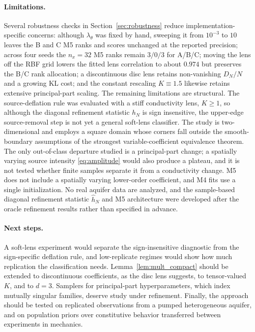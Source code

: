\documentclass[11pt]{article}
\numberwithin{table}{section}
\numberwithin{figure}{section}
\begin{document}
\paragraph{Limitations.}
Several robustness checks in Section~\ref{sec:robustness} reduce implementation-specific concerns: although $\lambda_\theta$ was fixed by hand, sweeping it from $10^{-3}$ to $10$ leaves the B and C M5 ranks and scores unchanged at the reported precision; across four seeds the $n_x=32$ M5 ranks remain $3/0/3$ for A/B/C; moving the lens off the RBF grid lowers the fitted lens correlation to about $0.974$ but preserves the B/C rank allocation; a discontinuous disc lens retains non-vanishing $D_N/N$ and a growing KL cost; and the constant rescaling $K\equiv1.5$ likewise retains extensive principal-part scaling. The remaining limitations are structural. The source-deflation rule was evaluated with a stiff conductivity lens, $K\ge1$, so although the diagonal refinement statistic $h_N$ is sign insensitive, the upper-edge source-removal step is not yet a general soft-lens classifier. The study is two-dimensional and employs a square domain whose corners fall outside the smooth-boundary assumptions of the strongest variable-coefficient equivalence theorem. The only out-of-class departure studied is a principal-part change; a spatially varying source intensity \eqref{eq:amplitude} would also produce a plateau, and it is not tested whether finite samples separate it from a conductivity change. M5 does not include a spatially varying lower-order coefficient, and M4 fits use a single initialization. No real aquifer data are analyzed, and the sample-based diagonal refinement statistic $\widehat h_N$ and M5 architecture were developed after the oracle refinement results rather than specified in advance.

\paragraph{Next steps.}
A soft-lens experiment would separate the sign-insensitive diagnostic from the sign-specific deflation rule, and low-replicate regimes would show how much replication the classification needs. Lemma~\ref{lem:mult_compact} should be extended to discontinuous coefficients, as the disc lens suggests, to tensor-valued $K$, and to $d=3$. Samplers for principal-part hyperparameters, which index mutually singular families, deserve study under refinement. Finally, the approach should be tested on replicated observations from a pumped heterogeneous aquifer, and on population priors over constitutive behavior transferred between experiments in mechanics.
\end{document}
